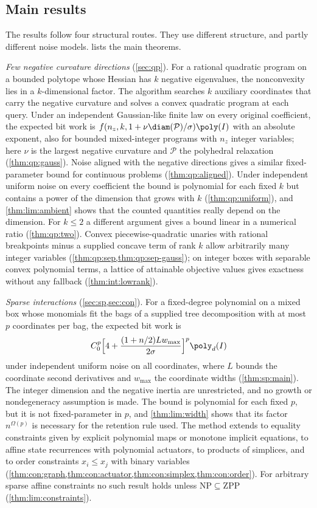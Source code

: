 \subsection{Main results}\label{sec:intro:results}

The results follow four structural routes. They use different structure,
and partly different noise models.  lists the main
theorems.

\emph{Few negative curvature directions} (\cref{sec:qp}). For a rational
quadratic program on a bounded polytope whose Hessian has $k$ negative
eigenvalues, the nonconvexity lies in a $k$-dimensional factor. The
algorithm searches $k$ auxiliary coordinates that carry the negative
curvature and solves a convex quadratic program at each query. Under an
independent Gaussian-like finite law on every original coefficient, the
expected bit work is $f(n_z,k,1+\nu\diam(\mathcal P)/\sigma)\poly(I)$ with an
absolute exponent, also for bounded mixed-integer programs with $n_z$
integer variables; here $\nu$ is the largest negative curvature and
$\mathcal P$ the polyhedral relaxation (\cref{thm:qp:gauss}). Noise aligned
with the negative directions gives a similar fixed-parameter bound for
continuous problems (\cref{thm:qp:aligned}). Under independent uniform noise
on every coefficient the bound is polynomial for each fixed $k$ but contains
a power of the dimension that grows with $k$ (\cref{thm:qp:uniform}), and
\cref{thm:lim:ambient} shows that the counted quantities really depend on
the dimension. For $k\le2$ a different argument gives a bound linear in a
numerical ratio (\cref{thm:qp:two}). Convex piecewise-quadratic unaries with
rational breakpoints minus a supplied concave term of rank $k$ allow
arbitrarily many integer variables
(\cref{thm:qp:sep,thm:qp:sep-gauss}); on integer boxes with separable convex
polynomial terms, a lattice of attainable objective values gives exactness
without any fallback (\cref{thm:int:lowrank}).

\emph{Sparse interactions} (\cref{sec:sp,sec:con}). For a fixed-degree
polynomial on a mixed box whose monomials fit the bags of a supplied tree
decomposition with at most $p$ coordinates per bag, the expected bit work is
\[
 C_0^p\Bigl[4+\frac{(1+n/2)Lw_{\max}}{2\sigma}\Bigr]^p\poly_d(I)
\]
under independent uniform noise on all coordinates, where $L$ bounds the
coordinate second derivatives and $w_{\max}$ the coordinate widths
(\cref{thm:sp:main}). The integer dimension and the negative inertia are
unrestricted, and no growth or nondegeneracy assumption is made. The bound is
polynomial for each fixed $p$, but it is not fixed-parameter in $p$, and
\cref{thm:lim:width} shows that its factor $n^{\Omega(p)}$ is necessary for
the retention rule used. The method extends to equality constraints given by
explicit polynomial maps or monotone implicit equations, to affine state
recurrences with polynomial actuators, to products of simplices, and to
order constraints $x_i\le x_j$ with binary variables
(\cref{thm:con:graph,thm:con:actuator,thm:con:simplex,thm:con:order}). For
arbitrary sparse affine constraints no such result holds unless
$\mathrm{NP}\subseteq\mathrm{ZPP}$ (\cref{thm:lim:constraints}).

